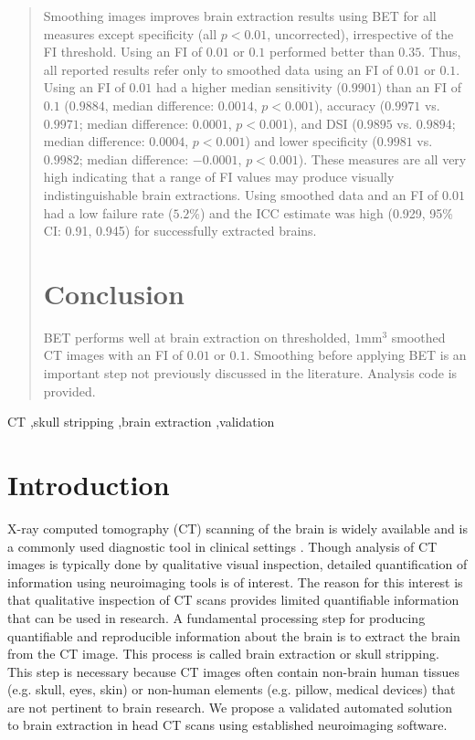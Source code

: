 \documentclass{elsarticle}\usepackage[]{graphicx}\usepackage[]{color}
\begin{document}
\begin{frontmatter}
\begin{abstract}
Smoothing images improves brain extraction results using BET for all measures except specificity (all $p < 0.01$, uncorrected), irrespective of the FI threshold.  Using an FI of $0.01$ or $0.1$ performed better than $0.35$.  Thus, all reported results refer only to smoothed data using an FI of $0.01$ or $0.1$.  Using an FI of $0.01$ had a higher median sensitivity ($0.9901$) than an FI of $0.1$ ($0.9884$, median difference: $0.0014$, $p< 0.001$), accuracy ($0.9971$ vs. $0.9971$; median difference: $0.0001$, $p< 0.001$), and DSI ($0.9895$ vs. $0.9894$; median difference: $0.0004$, $p< 0.001$) and lower specificity ($0.9981$ vs. $0.9982$; median difference: $-0.0001$, $p< 0.001$).  These measures are all very high indicating that a range of FI values may produce visually indistinguishable brain extractions.  Using smoothed data and an FI of $0.01$ had a low failure rate ($5.2$\%) and the ICC estimate was high (0.929, 95\% CI: 0.91, 0.945) for successfully extracted brains.

\section*{Conclusion}

BET performs well at brain extraction on thresholded, $1$mm$^3$ smoothed CT images with an FI of $0.01$ or $0.1$.  Smoothing before applying BET is an important step not previously discussed in the literature.  Analysis code is provided.

\end{abstract}

\begin{keyword}
CT \sep skull stripping \sep brain extraction \sep validation
\end{keyword}

\end{frontmatter}



\section{Introduction}

X-ray computed tomography (CT) scanning of the brain is widely available and is a commonly used diagnostic tool in clinical settings \citep{sahni_management_2007, chalela2007magnetic, schellinger1999standardized}. Though analysis of CT images is typically done by qualitative visual inspection, detailed quantification of information using neuroimaging tools is of interest.  The reason for this interest is that qualitative inspection of CT scans provides limited quantifiable information that can be used in research. A fundamental processing step for producing quantifiable and  reproducible information about the brain is to extract the brain from the CT image. This process is called brain extraction or skull stripping.  This step is necessary because CT images often contain non-brain human tissues (e.g. skull, eyes, skin) or non-human elements (e.g. pillow, medical devices) that are not pertinent to brain research.  We propose a validated automated solution to brain extraction in head CT scans using established neuroimaging software.
\end{document}
